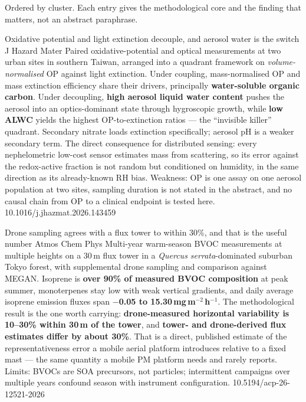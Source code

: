 \documentclass[10pt]{article}
\begin{document}
{\fontsize{7.4}{9}\selectfont\color{Slate}Ordered by cluster. Each entry gives the
methodological core and the finding that matters, not an abstract paraphrase.\par}


{Oxidative potential and light extinction decouple, and aerosol water is the switch}
{J Hazard Mater}
{Paired oxidative-potential and optical measurements at two urban sites in southern
Taiwan, arranged into a quadrant framework on \emph{volume-normalised} OP against light
extinction. Under coupling, mass-normalised OP and mass extinction efficiency share their
drivers, principally \textbf{water-soluble organic carbon}. Under decoupling, \textbf{high
aerosol liquid water content} pushes the aerosol into an optics-dominant state through
hygroscopic growth, while \textbf{low ALWC} yields the highest OP-to-extinction ratios ---
the ``invisible killer'' quadrant. Secondary nitrate loads extinction specifically; aerosol
pH is a weaker secondary term. The direct consequence for distributed sensing: every
nephelometric low-cost sensor estimates mass from scattering, so its error against the
redox-active fraction is not random but conditioned on humidity, in the same direction as
its already-known RH bias. Weakness: OP is one assay on one aerosol population at two
sites, sampling duration is not stated in the abstract, and no causal chain from OP to a
clinical endpoint is tested here.}
{10.1016/j.jhazmat.2026.143459}

{Drone sampling agrees with a flux tower to within 30\%, and that is the useful number}
{Atmos Chem Phys}
{Multi-year warm-season BVOC measurements at multiple heights on a 30\,m flux tower in a
\textit{Quercus serrata}-dominated suburban Tokyo forest, with supplemental drone sampling
and comparison against MEGAN. Isoprene is \textbf{over 90\% of measured BVOC composition}
at peak summer, monoterpenes stay low with weak vertical gradients, and daily average
isoprene emission fluxes span \textbf{$-$0.05 to 15.30\,mg\,m$^{-2}$\,h$^{-1}$}. The
methodological result is the one worth carrying: \textbf{drone-measured horizontal
variability is 10--30\% within 30\,m of the tower}, and \textbf{tower- and drone-derived
flux estimates differ by about 30\%}. That is a direct, published estimate of the
representativeness error a mobile aerial platform introduces relative to a fixed mast ---
the same quantity a mobile PM platform needs and rarely reports. Limits: BVOCs are
SOA precursors, not particles; intermittent campaigns over multiple years confound
season with instrument configuration.}
{10.5194/acp-26-12521-2026}
\end{document}
